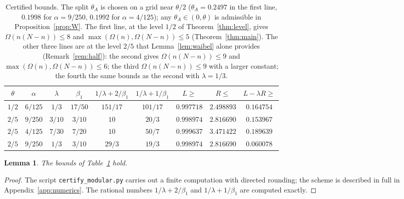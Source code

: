 \documentclass[11pt]{amsart}
\newtheorem{lemma}[theorem]{Lemma}
\theoremstyle{remark}
\begin{document}
\begin{table}[ht]
\centering
\small
\begin{tabular}{ccccccccc}
\hline
$\theta$ & $\alpha$ & $\lambda$ & $\beta_1$ & $1/\lambda+2/\beta_1$ & $1/\lambda+1/\beta_1$ & $L\ge$ & $R\le$ & $L-\lambda R\ge$\\
\hline
$1/2$ & $6/125$ & $1/3$ & $17/50$ & $151/17$ & $101/17$ & $0.997718$ & $2.498893$ & $0.164754$\\
$2/5$ & $9/250$ & $3/10$ & $3/10$ & $10$ & $20/3$ & $0.998974$ & $2.816690$ & $0.153967$\\
$2/5$ & $4/125$ & $7/30$ & $7/20$ & $10$ & $50/7$ & $0.999637$ & $3.471422$ & $0.189639$\\
$2/5$ & $9/250$ & $1/3$ & $3/10$ & $29/3$ & $19/3$ & $0.998974$ & $2.816690$ & $0.060078$\\
\hline
\end{tabular}
\medskip
\caption{Certified bounds. The split $\theta_A$ is chosen on a grid near $\theta/2$ ($\theta_A=0.2497$ in the first line, $0.1998$ for $\alpha=9/250$, $0.1992$ for $\alpha=4/125$); any $\theta_A\in(0,\theta)$ is admissible in Proposition~\ref{prop:W}. The first line, at the level $1/2$ of Theorem~\ref{thm:level}, gives $\Omega(n(N-n))\le8$ and $\max(\Omega(n),\Omega(N-n))\le5$ (Theorem~\ref{thm:main}). The other three lines are at the level $2/5$ that Lemma~\ref{lem:waibel} alone provides (Remark~\ref{rem:half}): the second gives $\Omega(n(N-n))\le9$ and $\max(\Omega(n),\Omega(N-n))\le6$; the third $\Omega(n(N-n))\le 9$ with a larger constant; the fourth the same bounds as the second with $\lambda=1/3$.}
\label{tab:cert}
\end{table}

\begin{lemma}\label{lem:numerics}
The bounds of Table~\ref{tab:cert} hold.
\end{lemma}
\begin{proof}
The script \texttt{certify\_modular.py} carries out a finite computation with directed rounding; the scheme is described in full in Appendix~\ref{app:numerics}. The rational numbers $1/\lambda+2/\beta_1$ and $1/\lambda+1/\beta_1$ are computed exactly.
\end{proof}
\end{document}
